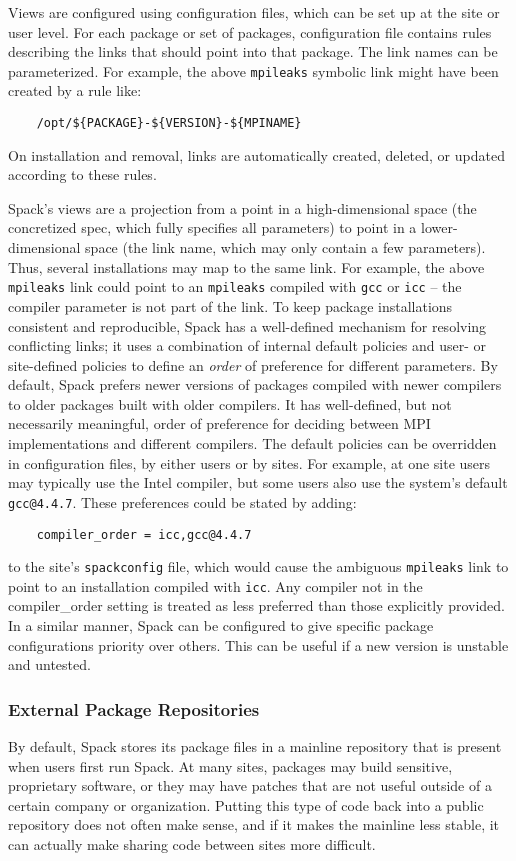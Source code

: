 Views are configured using configuration files, which can be set up at the site or
user level.
For each package or set of packages, configuration file contains rules
describing the links that should point into that package.
The link names can be parameterized.
For example, the above {\tt mpileaks} symbolic link might have been created by a rule like:
%
\begin{verbatim}
    /opt/${PACKAGE}-${VERSION}-${MPINAME}
\end{verbatim}
%
On installation and removal,
links are automatically created, deleted, or updated according to these rules.

Spack's views are a projection from a point in a high-dimensional space
(the concretized spec, which fully specifies all parameters) to point
in a lower-dimensional space
(the link name, which may only contain a few parameters).
Thus, several installations may map to the same link.
For example, the above {\tt mpileaks} link could point to an {\tt mpileaks} compiled with
{\tt gcc} or {\tt icc} -- the compiler parameter is not part of the link.
To keep  package installations consistent and reproducible,
Spack has a well-defined mechanism for resolving conflicting links;
it uses a combination of internal default policies and user- or site-defined
policies to define an {\it order} of preference for different parameters.
By default, Spack prefers newer versions of packages compiled with newer compilers
to older packages built with older compilers. It has well-defined, but not
necessarily meaningful, order of preference for deciding between MPI
implementations and different compilers.
The default policies can be overridden in configuration files, by either users
or by sites. For example, at one site users may typically use the Intel compiler,
but some users also use the system's default {\tt gcc@4.4.7}.
These preferences could be stated by adding:
%
\begin{verbatim}
    compiler_order = icc,gcc@4.4.7
\end{verbatim}
%
to the site's {\tt spackconfig} file, which would cause the ambiguous
{\tt mpileaks} link to point to an installation compiled with {\tt icc}.
Any compiler not in the compiler\_order setting is treated as less preferred
than those explicitly provided.
%
In a similar manner, Spack can be configured to give specific package
configurations priority over others.
This can be useful if a new version is unstable and untested.

\subsubsection{External Package Repositories}
By default, Spack stores its package files in a mainline repository
that is present when users
first run Spack.  At many sites, packages may build sensitive,
proprietary software, or they
may have patches that are not useful outside of a certain company or
organization.  Putting this type of code back into a public repository
does not often make sense, and if it makes the
mainline less stable, it can actually make sharing code between sites more difficult.

